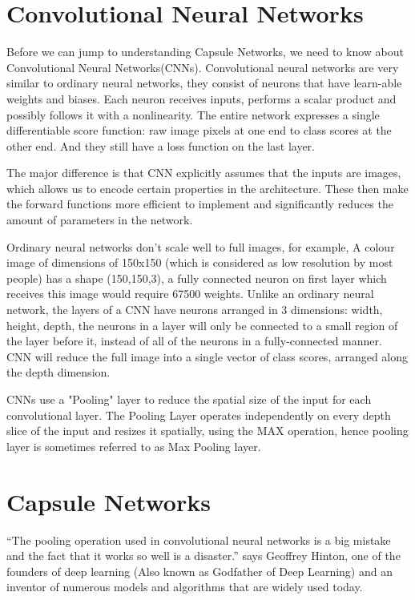 \section{Convolutional Neural Networks} %
\label{sec:convolutional_neural_networks}
Before we can jump to understanding Capsule Networks, we need to know about Convolutional Neural Networks(CNNs). Convolutional neural networks are very similar to ordinary neural networks, they consist of neurons that have learn-able weights and biases. Each neuron receives inputs, performs a scalar product and possibly follows it with a nonlinearity. The entire network expresses a single differentiable score function: raw image pixels at one end to class scores at the other end. And they still have a loss function on the last layer.\par\bigskip
The major difference is that CNN explicitly assumes that the inputs are images, which allows us to encode certain properties in the architecture. These then make the forward functions more efficient to implement and significantly reduces the amount of parameters in the network.\par\bigskip
Ordinary neural networks don’t scale well to full images, for example, A colour image of dimensions of 150x150 (which is considered as low resolution by most people) has a shape (150,150,3), a fully connected neuron on first layer which receives this image would require 67500 weights. Unlike an ordinary neural network, the layers of a CNN have neurons arranged in 3 dimensions: width, height, depth, the neurons in a layer will only be connected to a small region of the layer before it, instead of all of the neurons in a fully-connected manner. CNN  will reduce the full image into a single vector of class scores, arranged along the depth dimension.\par\bigskip
CNNs use a "Pooling" layer to reduce the spatial size of the input for each convolutional layer. The Pooling Layer operates independently on every depth slice of the input and resizes it spatially, using the MAX operation, hence pooling layer is sometimes referred to as Max Pooling layer.

\section{Capsule Networks} %
\label{sec:capsule_networks}
“The pooling operation used in convolutional neural networks is a big mistake and the fact that it works so well is a disaster.” says Geoffrey Hinton, one of the founders of deep learning (Also known as Godfather of Deep Learning) and an inventor of numerous models and algorithms that are widely used today.
